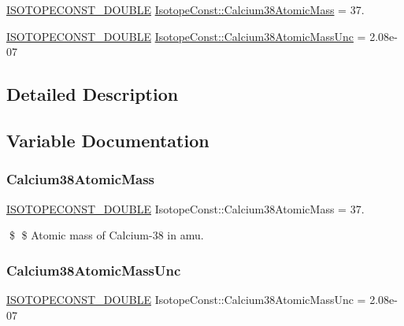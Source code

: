 \begin{DoxyCompactItemize}
\item 
\mbox{\hyperlink{group___isotope_const-_macros_ga8f45a7272ce02c0b4c65c44636ed719a}{I\+S\+O\+T\+O\+P\+E\+C\+O\+N\+S\+T\+\_\+\+D\+O\+U\+B\+LE}} \mbox{\hyperlink{group___isotope_const-_calcium-_ca38_gaec178d016a05f318598907f4f3c86b8d}{Isotope\+Const\+::\+Calcium38\+Atomic\+Mass}} = 37.
\item 
\mbox{\hyperlink{group___isotope_const-_macros_ga8f45a7272ce02c0b4c65c44636ed719a}{I\+S\+O\+T\+O\+P\+E\+C\+O\+N\+S\+T\+\_\+\+D\+O\+U\+B\+LE}} \mbox{\hyperlink{group___isotope_const-_calcium-_ca38_ga2b4763e7f34879099cbfb7abbd0c6bc7}{Isotope\+Const\+::\+Calcium38\+Atomic\+Mass\+Unc}} = 2.\+08e-\/07
\end{DoxyCompactItemize}


\subsection{Detailed Description}


\subsection{Variable Documentation}
\mbox{\label{group___isotope_const-_calcium-_ca38_gaec178d016a05f318598907f4f3c86b8d}} 
\subsubsection{\texorpdfstring{Calcium38\+Atomic\+Mass}{Calcium38AtomicMass}}
{\footnotesize\ttfamily \mbox{\hyperlink{group___isotope_const-_macros_ga8f45a7272ce02c0b4c65c44636ed719a}{I\+S\+O\+T\+O\+P\+E\+C\+O\+N\+S\+T\+\_\+\+D\+O\+U\+B\+LE}} Isotope\+Const\+::\+Calcium38\+Atomic\+Mass = 37.}

\$ \$ Atomic mass of Calcium-\/38 in amu. \mbox{\label{group___isotope_const-_calcium-_ca38_ga2b4763e7f34879099cbfb7abbd0c6bc7}} 
\subsubsection{\texorpdfstring{Calcium38\+Atomic\+Mass\+Unc}{Calcium38AtomicMassUnc}}
{\footnotesize\ttfamily \mbox{\hyperlink{group___isotope_const-_macros_ga8f45a7272ce02c0b4c65c44636ed719a}{I\+S\+O\+T\+O\+P\+E\+C\+O\+N\+S\+T\+\_\+\+D\+O\+U\+B\+LE}} Isotope\+Const\+::\+Calcium38\+Atomic\+Mass\+Unc = 2.\+08e-\/07}

